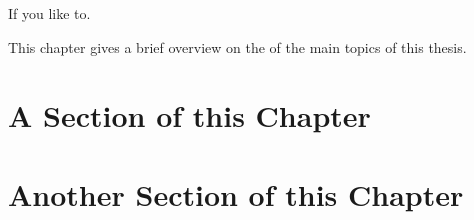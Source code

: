 
       {If you like to.}

This chapter gives a brief overview on the \SOTA of the main topics of this thesis.

\chapterSupportedBy{\sotaCitesLong}




\section{A Section of this Chapter}
\label{sec:sota:ASection}
%

\section{Another Section of this Chapter}
\label{sec:sota:AnotherSection}
%
